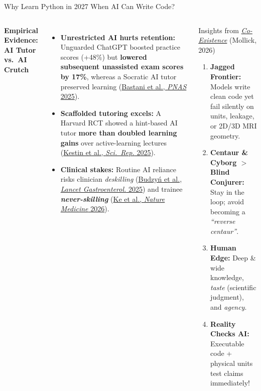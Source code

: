 \documentclass[aspectratio=169, 10pt]{beamer}
\begin{document}
\begin{frame}{Why Learn Python in 2027 When AI Can Write Code?}
    \begin{columns}[T,onlytextwidth]
        \textbf{Empirical Evidence: AI Tutor vs.\ AI Crutch}
        \begin{itemize}
            \item \textbf{Unrestricted AI hurts retention:} Unguarded ChatGPT boosted practice scores (+48\%) but \textbf{lowered subsequent unassisted exam scores by 17\%}, whereas a Socratic AI tutor preserved learning (\href{https://doi.org/10.1073/pnas.2422633122}{Bastani et al., \textit{PNAS} 2025}).
            \item \textbf{Scaffolded tutoring excels:} A Harvard RCT showed a hint-based AI tutor \textbf{more than doubled learning gains} over active-learning lectures (\href{https://doi.org/10.1038/s41598-025-97652-6}{Kestin et al., \textit{Sci.\ Rep.} 2025}).
            \item \textbf{Clinical stakes:} Routine AI reliance risks clinician \textit{deskilling} (\href{https://doi.org/10.1016/S2468-1253(25)00133-5}{Budzy\'n et al., \textit{Lancet Gastroenterol.} 2025}) and trainee \textbf{\textit{never-skilling}} (\href{https://doi.org/10.1038/s41591-026-04438-y}{Ke et al., \textit{Nature Medicine} 2026}).
        \end{itemize}

        \begin{block}{Insights from \href{https://co-existence.ai/}{\textit{Co-Existence}} (Mollick, 2026)}
            \footnotesize
            \begin{enumerate}
                \item \textbf{Jagged Frontier:} Models write clean code yet fail silently on units, leakage, or 2D/3D MRI geometry.
                \item \textbf{Centaur \& Cyborg $>$ Blind Conjurer:} Stay in the loop; avoid becoming a \textit{``reverse centaur''}.
                \item \textbf{Human Edge:} Deep \& wide knowledge, \textit{taste} (scientific judgment), and \textit{agency}.
                \item \textbf{Reality Checks AI:} Executable code + physical units test claims immediately!
            \end{enumerate}
        \end{block}
    \end{columns}
\end{frame}
\end{document}
